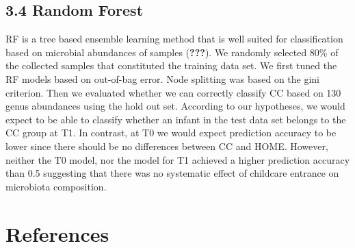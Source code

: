 \documentclass[,man]{apa6}
\begin{document}
\subsection{3.4 Random Forest}\label{random-forest}

RF is a tree based ensemble learning method that is well suited for
classification based on microbial abundances of samples
({\textbf{???}}). We randomly selected 80\% of the collected samples
that constituted the training data set. We first tuned the RF models
based on out-of-bag error. Node splitting was based on the gini
criterion. Then we evaluated whether we can correctly classify CC based
on 130 genus abundances using the hold out set. According to our
hypotheses, we would expect to be able to classify whether an infant in
the test data set belongs to the CC group at T1. In contrast, at T0 we
would expect prediction accuracy to be lower since there should be no
differences between CC and HOME. However, neither the T0 model, nor the
model for T1 achieved a higher prediction accuracy than 0.5 suggesting
that there was no systematic effect of childcare entrance on microbiota
composition.

\newpage

\newpage

\section{References}\label{references}

\begingroup
\setlength{\parindent}{-0.5in} \setlength{\leftskip}{0.5in}

\hypertarget{refs}{}

\endgroup

\clearpage

\renewcommand{\listfigurename}{Figure captions}

\listoffigures

\clearpage

\renewcommand{\listtablename}{Table captions}

\listoftables
\end{document}
